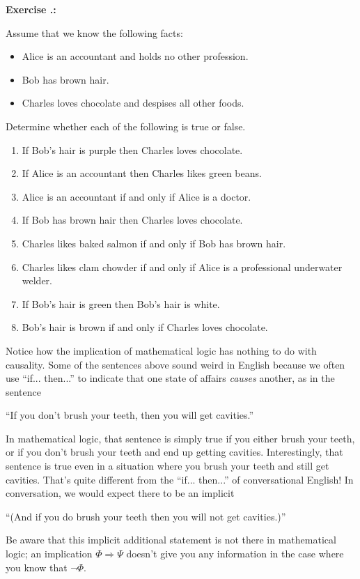 \documentclass[12pt]{article}
\newcommand{\ARR}{\Rightarrow}
\newcounter{exercise}[subsubsection]
\newcommand{\ex}[1]{ \refstepcounter{exercise} \textbf{Exercise \thesubsubsection.\theexercise:}\begin{adjustwidth}{2em}{}#1\end{adjustwidth}}
\def\pA{\Phi}
\def\pB{\Psi}
\begin{document}
\ex{
Assume that we know the following facts:
\begin{itemize}
\item Alice is an accountant and holds no other profession.
\item Bob has brown hair.
\item Charles loves chocolate and despises all other foods.
\end{itemize}
Determine whether each of the following is true or false.
\begin{enumerate}


\item %
If
Bob's hair is purple
then
Charles loves chocolate.


\item %
If
Alice is an accountant
then
Charles likes green beans.


\item %
Alice is an accountant
if and only if
Alice is a doctor.


\item %
If
Bob has brown hair
then
Charles loves chocolate.


\item %
Charles likes baked salmon
if and only if
Bob has brown hair.


\item %
Charles likes clam chowder
if and only if
Alice is a professional underwater welder.

\item %
If
Bob's hair is green
then
Bob's hair is white.

\item %
Bob's hair is brown
if and only if
Charles loves chocolate.


\end{enumerate}

Notice how the implication of mathematical logic has nothing to do with causality.
Some of the sentences above sound weird in English because we often use ``if... then...'' to 
indicate that one state of affairs \emph{causes} another, as in the sentence
\begin{center}``If you don't brush your teeth, then you will get cavities.''\end{center}
In mathematical logic, that sentence is simply true if you either brush your teeth, or if you don't brush your teeth and end up getting cavities.
Interestingly, that sentence is true even in a situation where you brush your teeth and still get cavities.
That's quite different from the ``if... then...'' of conversational English!
In conversation, we would expect there to be an implicit
\begin{center}``(And if you do brush your teeth then you will not get cavities.)''\end{center}
Be aware that this implicit additional statement is not there in mathematical logic; 
an implication $\pA\ARR\pB$ doesn't give you any information in the case where you know that $\neg\pA$.
}
\end{document}
